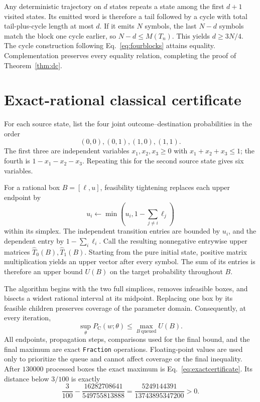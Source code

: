 \documentclass[a4paper,twocolumn,11pt,unpublished]{quantumarticle}
\begin{document}
Any deterministic trajectory on $d$ states repeats a state among the first
$d+1$ visited states.  Its emitted word is therefore a tail followed by a
cycle with total tail-plus-cycle length at most $d$.  If it emits $N$
symbols, the last $N-d$ symbols match the block one cycle earlier, so
$N-d\leq M(T_n)$.  This yields $d\geq3N/4$.  The cycle construction following
Eq.~\eqref{eq:fourblocks} attains equality.  Complementation preserves every
equality relation, completing the proof of Theorem~\ref{thm:dc}.

\section{Exact-rational classical certificate}
\label{app:certificate}

For each source state, list the four joint outcome--destination
probabilities in the order
\[
(0,0),(0,1),(1,0),(1,1).
\]
The first three are independent variables $x_1,x_2,x_3\geq0$ with
$x_1+x_2+x_3\leq1$; the fourth is
$1-x_1-x_2-x_3$.  Repeating this for the second source state gives six
variables.

For a rational box $B=[\ell,u]$, feasibility tightening replaces each upper
endpoint by
\[
u_i\leftarrow\min\!\left(u_i,1-\sum_{j\neq i}\ell_j\right)
\]
within its simplex.  The independent transition entries are bounded by
$u_i$, and the dependent entry by $1-\sum_i\ell_i$.  Call the resulting
nonnegative entrywise upper matrices $\widehat T_0(B),\widehat T_1(B)$.
Starting from the pure initial state, positive matrix multiplication yields
an upper vector after every symbol.  The sum of its entries is therefore an
upper bound $U(B)$ on the target probability throughout $B$.

The algorithm begins with the two full simplices, removes infeasible boxes,
and bisects a widest rational interval at its midpoint.  Replacing one box
by its feasible children preserves coverage of the parameter domain.
Consequently, at every iteration,
\[
\sup_{\theta}P_{\mathrm C}(w;\theta)
\leq\max_{B\ \mathrm{queued}}U(B).
\]
All endpoints, propagation steps, comparisons used for the final bound, and
the final maximum are exact \texttt{Fraction} operations.  Floating-point
values are used only to prioritize the queue and cannot affect coverage or
the final inequality.  After $130000$ processed boxes the exact maximum is
Eq.~\eqref{eq:exactcertificate}.  Its distance below $3/100$ is exactly
\[
\frac{3}{100}
-\frac{16282708641}{549755813888}
=\frac{5249144391}{13743895347200}>0.
\]
\end{document}
